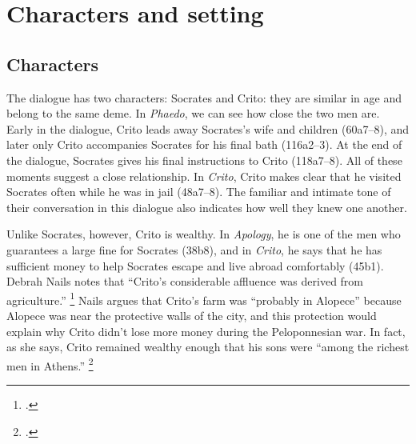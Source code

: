 \documentclass[12pt,letterpaper]{article}
\newcommand{\MONTH}{%
  \ifcase\the\month\
  \or\ January%
  \or\ February%
  \or\ March%
  \or\ April%
  \or\ May%
  \or\ June%
  \or\ July%
  \or\ August%
  \or\ September%
  \or\ October%
  \or\ November%
  \or\ December%
  \fi}
\begin{document}

\pagestyle{notes}

\section*{Characters and setting}

\subsection*{Characters}

The dialogue has two characters: Socrates and Crito: they are similar in age and belong to the same deme.
In \textit{Phaedo}, we can see how close the two men are.
Early in the dialogue, Crito leads away Socrates's wife and children (60a7--8), and later only Crito accompanies Socrates for his final bath (116a2--3).
At the end of the dialogue, Socrates gives his final instructions to Crito (118a7--8).
All of these moments suggest a close relationship.
In \textit{Crito}, Crito makes clear that he visited Socrates often while he was in jail (48a7--8).
The familiar and intimate tone of their conversation in this dialogue also indicates how well they knew one another.

Unlike Socrates, however, Crito is wealthy.
In \textit{Apology}, he is one of the men who guarantees a large fine for Socrates (38b8), and in \textit{Crito}, he says that he has sufficient money to help Socrates escape and live abroad comfortably (45b1).
Debrah Nails notes that ``Crito's considerable affluence was derived from agriculture.''%
\footcite[][115.
She cites \textit{Euthydemus} 291e, Xenophon's \textit{Memorabilia} 2.9.4, and Diogenes Laertius 2.31.]{nails2002-people-of-plato}
Nails argues that Crito's farm was ``probably in Alopece'' because Alopece was near the protective walls of the city, and this protection would explain why Crito didn't lose more money during the Peloponnesian war.
In fact, as she says, Crito remained wealthy enough that his sons were ``among the richest men in Athens.''%
\footcite[][115]{nails2002-people-of-plato}
\end{document}
